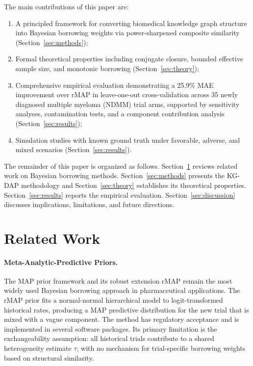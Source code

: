 \documentclass[12pt]{article}
\begin{document}
The main contributions of this paper are:
\begin{enumerate}
    \item A principled framework for converting biomedical knowledge graph structure into Bayesian borrowing weights via power-sharpened composite similarity (Section~\ref{sec:methods});
    \item Formal theoretical properties including conjugate closure, bounded effective sample size, and monotonic borrowing (Section~\ref{sec:theory});
    \item Comprehensive empirical evaluation demonstrating a 25.9\% MAE improvement over rMAP in leave-one-out cross-validation across 35 newly diagnosed multiple myeloma (NDMM) trial arms, supported by sensitivity analyses, contamination tests, and a component contribution analysis (Section~\ref{sec:results});
    \item Simulation studies with known ground truth under favorable, adverse, and mixed scenarios (Section~\ref{sec:results}).
\end{enumerate}

The remainder of this paper is organized as follows. Section~\ref{sec:related} reviews related work on Bayesian borrowing methods. Section~\ref{sec:methods} presents the KG-DAP methodology and Section~\ref{sec:theory} establishes its theoretical properties. Section~\ref{sec:results} reports the empirical evaluation. Section~\ref{sec:discussion} discusses implications, limitations, and future directions.

\section{Related Work}
\label{sec:related}

\paragraph{Meta-Analytic-Predictive Priors.}
The MAP prior framework \citep{neuenschwander2010summarizing} and its robust extension rMAP \citep{schmidli2014robust} remain the most widely used Bayesian borrowing approach in pharmaceutical applications. The rMAP prior fits a normal-normal hierarchical model to logit-transformed historical rates, producing a MAP predictive distribution for the new trial that is mixed with a vague component. The method has regulatory acceptance \citep{fda2019adaptive} and is implemented in several software packages. Its primary limitation is the exchangeability assumption: all historical trials contribute to a shared heterogeneity estimate $\tau$, with no mechanism for trial-specific borrowing weights based on structural similarity.
\end{document}
